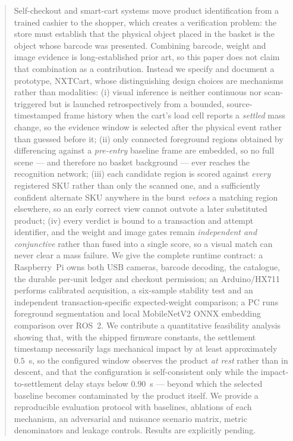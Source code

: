 \documentclass[conference]{IEEEtran}
\begin{document}
\begin{abstract}
Self-checkout and smart-cart systems move product identification from a trained cashier to the
shopper, which creates a verification problem: the store must establish that the physical object
placed in the basket is the object whose barcode was presented. Combining barcode, weight and image
evidence is long-established prior art, so this paper does not claim that combination as a
contribution. Instead we specify and document a prototype, NXTCart, whose distinguishing design
choices are mechanisms rather than modalities: (i) visual inference is neither continuous nor
scan-triggered but is launched retrospectively from a bounded, source-timestamped frame history when
the cart's load cell reports a \emph{settled} mass change, so the evidence window is selected after
the physical event rather than guessed before it; (ii) only connected foreground regions obtained by
differencing against a \emph{pre-entry} baseline frame are embedded, so no full scene --- and
therefore no basket background --- ever reaches the recognition network; (iii) each candidate region
is scored against \emph{every} registered SKU rather than only the scanned one, and a sufficiently
confident alternate SKU anywhere in the burst \emph{vetoes} a matching region elsewhere, so an early
correct view cannot outvote a later substituted product; (iv) every verdict is bound to a transaction
and attempt identifier, and the weight and image gates remain \emph{independent and conjunctive}
rather than fused into a single score, so a visual match can never clear a mass failure. We give the
complete runtime contract: a Raspberry~Pi owns both USB cameras, barcode decoding, the catalogue, the
durable per-unit ledger and checkout permission; an Arduino/HX711 performs calibrated acquisition, a
six-sample stability test and an independent transaction-specific expected-weight comparison; a PC
runs foreground segmentation and local MobileNetV2 ONNX embedding comparison over ROS~2. We
contribute a quantitative feasibility analysis showing that, with the shipped firmware constants, the
settlement timestamp necessarily lags mechanical impact by at least approximately $0.5$~s, so the
configured window observes the product \emph{at rest} rather than in descent, and that the
configuration is self-consistent only while the impact-to-settlement delay stays below $0.90$~s ---
beyond which the selected baseline becomes contaminated by the product itself. We provide a
reproducible evaluation protocol with baselines, ablations of each mechanism, an adversarial and
nuisance scenario matrix, metric denominators and leakage controls. Results are explicitly pending.
\end{abstract}
\end{document}
